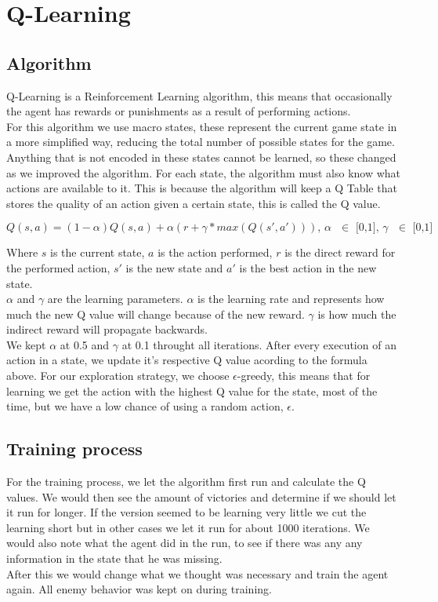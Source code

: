 \documentclass{article}
\begin{document}
  \section{Q-Learning}
  \subsection{Algorithm}
  Q-Learning is a Reinforcement Learning algorithm, this means that occasionally the agent has rewards or punishments as a result of
  performing actions.\\
  For this algorithm we use macro states, these represent the current game state in a more simplified way, reducing the total
  number of possible states for the game. Anything that is not encoded in these states cannot be learned, so these changed as
  we improved the algorithm. For each state, the algorithm must also know what actions are available to it. This is because the
  algorithm will keep a Q Table that stores the quality of an action given a certain state, this is called the Q value.

  \[Q(s,a) = (1-\alpha)Q(s, a) + \alpha(r + \gamma * max(Q(s', a'))) \text{, $\alpha$ $\in$ [0,1], $\gamma$ $\in$ [0,1]}\]

  \noindent
  Where $s$ is the current state, $a$ is the action performed, $r$ is the direct reward for the performed action,
  $s'$ is the new state and $a'$ is the best action in the new state.\\
  $\alpha$ and $\gamma$ are the learning parameters.
  $\alpha$ is the learning rate and represents how much the new Q value will change because of the new reward.
  $\gamma$ is how much the indirect reward will propagate backwards.\\
  We kept $\alpha$ at 0.5 and $\gamma$ at 0.1 throught all iterations.
  \noindent
  After every execution of an action in a state, we update it's respective Q value acording to the formula above. 
  For our exploration strategy, we choose $\epsilon$-greedy, this means that for learning we get the action with the highest Q value for
  the state, most of the time, but we have a low chance of using a random action, $\epsilon$.\\
  
  \subsection{Training process}
  For the training process, we let the algorithm first run and calculate the Q values.
  We would then see the amount of victories and determine if we should let it run for longer. If the version seemed to be learning very little
  we cut the learning short but in other cases we let it run for about 1000 iterations.
  We would also note what the agent did in the run, to see if there was any any information
  in the state that he was missing.\\
  After this we would change what we thought was necessary and train the agent again. All enemy behavior was kept on during training.
\end{document}
